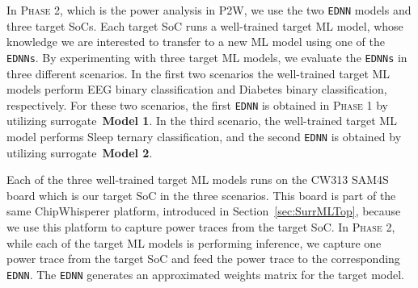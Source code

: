 \documentclass[letterpaper]{article}
\begin{document}
In \textsc{Phase 2}, which is the power analysis in P2W, we use the two \texttt{EDNN} models and three target SoCs. Each target SoC runs a well-trained target ML model, whose knowledge we are interested to transfer to a new ML model using one of the \texttt{EDNNs}. By experimenting with three target ML models, we evaluate the \texttt{EDNNs} in three different scenarios. In the first two scenarios the well-trained target ML models perform EEG binary classification and Diabetes binary classification, respectively. For these two scenarios, the first \texttt{EDNN} is obtained in \textsc{Phase 1} by utilizing surrogate~\textbf{Model 1}. In the third scenario, the well-trained target ML model performs Sleep ternary classification, and the second \texttt{EDNN} is obtained by utilizing surrogate~\textbf{Model 2}.  

Each of the three well-trained target ML models runs on the CW313 SAM4S board which is our target SoC in the three scenarios.  This board is part of the same ChipWhisperer platform, introduced in Section~\ref{sec:SurrMLTop}, because we use this platform to capture power traces from the target SoC. In \textsc{Phase 2}, while each of the target ML models is performing inference, we capture one power trace from the target SoC and feed the power trace to the corresponding \texttt{EDNN}. The \texttt{EDNN} generates an approximated weights matrix for the target model.
\end{document}
